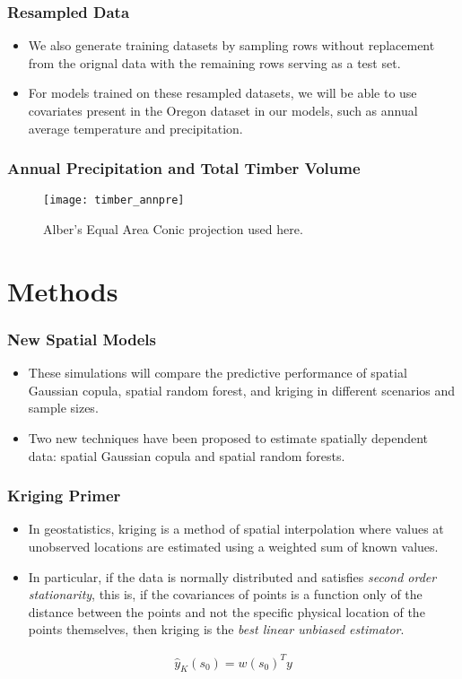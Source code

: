\documentclass{beamer}
\begin{document}
\begin{frame}
	\frametitle{Resampled Data}
	\begin{itemize}
		\item We also generate training datasets by sampling rows without replacement from the orignal data with the remaining rows serving as a test set.
		\item For models trained on these resampled datasets, we will be able to use covariates present in the Oregon dataset in our models, such as annual average temperature and precipitation.
	\end{itemize}
\end{frame}


\begin{frame}
	\frametitle{Annual Precipitation and Total Timber Volume}
	\begin{center}
		\begin{figure}[ht]
			\texttt{[image: timber\_annpre]}
			\caption{Alber's Equal Area Conic projection used here.}
		\end{figure}
	\end{center}
\end{frame}

\section{Methods}

\begin{frame}
	\frametitle{New Spatial Models}
	\begin{itemize}
		\item  These simulations will compare the predictive performance of spatial Gaussian copula, spatial random forest, and kriging in different scenarios and sample sizes.
		\item Two new techniques have been proposed to estimate spatially dependent data: spatial Gaussian copula and spatial random forests.
	\end{itemize}
\end{frame}

\begin{frame}
	\frametitle{Kriging Primer}
	\begin{itemize}
		\item In geostatistics, kriging is a method of spatial interpolation where values at unobserved locations are estimated using a weighted sum of known values.
		\item In particular, if the data is normally distributed and satisfies \textit{second order stationarity}, this is, if the covariances of points is a function only of the distance between the points and not the specific physical location of the points themselves, then kriging is the \textit{best linear unbiased estimator}\cite{cressie93}.
	\end{itemize}
	\begin{align*}
		\hat{y}_{K}(s_0) = w(s_0)^T y
	\end{align*}
\end{frame}
\end{document}
